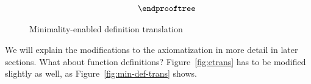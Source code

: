 \begin{figure}
\[\begin{array}{c}
{\begin{array}{l}
{\begin{array}{l}
\begin{array}{ll}
                   \end{array}
     \end{array}}
  \end{array}}
\endprooftree
\end{array}\]
\caption{Minimality-enabled definition translation}\label{fig:min-def-trans-min}
\end{figure}



We will explain the modifications to the axiomatization in more detail in later sections.
What about function definitions? Figure~\ref{fig:etrans} has to be modified slightly as well,
as Figure~\ref{fig:min-def-trans} shows.

